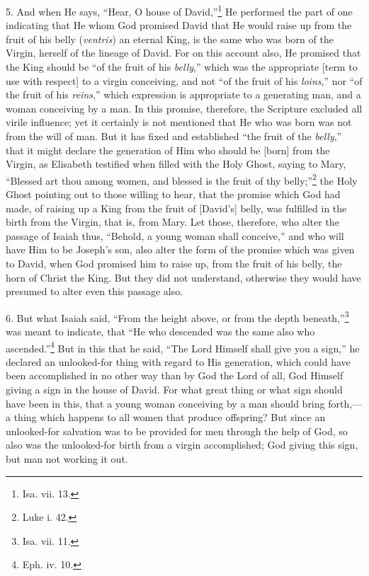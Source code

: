 5. And when He says, “Hear, O house of David,”\footnote{Isa. vii. 13.} He performed the part of one indicating  that He whom God promised David that He would raise up from the fruit of his belly (\emph{ventris}) an eternal King, is the same who was born of the Virgin, herself of the lineage of David. For on this account also, He promised that the King should be “of the fruit of his \emph{belly},” which was the appropriate [term to use with respect] to a virgin conceiving, and not “of the fruit of his \emph{loins},” nor “of the fruit of his \emph{reins},” which expression is appropriate to a generating man, and a woman conceiving by a man. In this promise, therefore, the Scripture excluded all virile influence; yet it certainly is not mentioned that He who was born was not from the will of man. But it has fixed and established “the fruit of the \emph{belly},” that it might declare the generation of Him who should be [born] from the Virgin, as Elisabeth testified when filled with the Holy Ghost, saying to Mary, “Blessed art thou among women, and blessed is the fruit of thy belly;”\footnote{Luke i. 42.} the Holy Ghost pointing out to those willing to hear, that the promise which God had made, of raising up a King from the fruit of [David’s] belly, was fulfilled in the birth from the Virgin, that is, from Mary. Let those, therefore, who alter the passage of Isaiah thus, “Behold, a young woman shall conceive,” and who will have Him to be Joseph’s son, also alter the form of the promise which was given to David, when God promised him to raise up, from the fruit of his belly, the horn of Christ the King. But they did not understand, otherwise they would have presumed to alter even this passage also.

6. But what Isaiah said, “From the height above, or from the depth beneath,”\footnote{Isa. vii. 11.} was meant to indicate, that “He who descended was the same also who ascended.”\footnote{Eph. iv. 10.} But in this that he said, “The Lord Himself shall give you a sign,” he declared an unlooked-for thing with regard to His generation, which could have been accomplished in no other way than by God the Lord of all, God Himself giving a sign in the house of David. For what great thing or what sign should have been in this, that a young woman conceiving by a man should bring forth,—a thing which happens to all women that produce offspring? But since an unlooked-for salvation was to be provided for men through the help of God, so also was the unlooked-for birth from a virgin accomplished; God giving this sign, but man not working it out.

